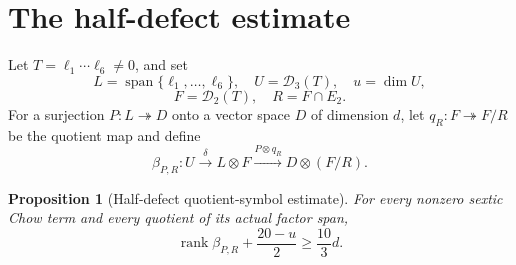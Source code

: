 \documentclass[11pt]{amsart}
\newcommand{\Span}{\operatorname{span}}
\newcommand{\rank}{\operatorname{rank}}
\newcommand{\cD}{\mathcal{D}}
\newtheorem{proposition}[theorem]{Proposition}
\theoremstyle{definition}
\begin{document}
\section{The half-defect estimate}\label{sec:half-defect}

Let \(T=\ell_1\cdots\ell_6\ne0\), and set
\[
 L=\Span\{\ell_1,\ldots,\ell_6\},\quad
 U=\cD_3(T),\quad u=\dim U,
\]
\[
 F=\cD_2(T),\quad R=F\cap E_2.
\]
For a surjection \(P:L\twoheadrightarrow D\) onto a vector space \(D\) of
dimension \(d\), let
\(q_R:F\twoheadrightarrow F/R\) be the quotient map and define
\[
 \beta_{P,R}:U\xrightarrow{\delta}L\otimes F
 \xrightarrow{P\otimes q_R}D\otimes(F/R).
\]

\begin{proposition}[Half-defect quotient-symbol estimate]
\label{prop:half-defect}
For every nonzero sextic Chow term and every quotient of its actual factor
span,
\[
 \boxed{\rank\beta_{P,R}+\frac{20-u}{2}\ge\frac{10}{3}d.} \tag{4.1}
\]
\end{proposition}
\end{document}
